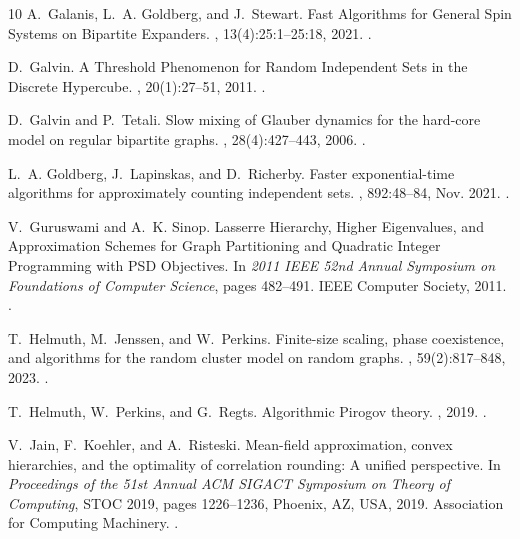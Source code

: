 \documentclass[11pt,letterpaper]{amsart}
\theoremstyle{definition}
\begin{document}
\begin{thebibliography}{10}
A.~Galanis, L.~A. Goldberg, and J.~Stewart.
\newblock Fast {{Algorithms}} for {{General Spin Systems}} on {{Bipartite
  Expanders}}.
, 13(4):25:1--25:18,
  2021.
\newblock {}.

D.~Galvin.
\newblock A {{Threshold Phenomenon}} for {{Random Independent Sets}} in the
  {{Discrete Hypercube}}.
, 20(1):27--51, 2011.
\newblock {}.

D.~Galvin and P.~Tetali.
\newblock Slow mixing of {{Glauber}} dynamics for the hard-core model on
  regular bipartite graphs.
, 28(4):427--443, 2006.
\newblock {}.

L.~A. Goldberg, J.~Lapinskas, and D.~Richerby.
\newblock Faster exponential-time algorithms for approximately counting
  independent sets.
, 892:48--84, Nov. 2021.
\newblock {}.

V.~Guruswami and A.~K. Sinop.
\newblock Lasserre {{Hierarchy}}, {{Higher Eigenvalues}}, and {{Approximation
  Schemes}} for {{Graph Partitioning}} and {{Quadratic Integer Programming}}
  with {{PSD Objectives}}.
\newblock In {\em 2011 {{IEEE}} 52nd {{Annual Symposium}} on {{Foundations}} of
  {{Computer Science}}}, pages 482--491. {IEEE Computer Society}, 2011.
\newblock {}.

T.~Helmuth, M.~Jenssen, and W.~Perkins.
\newblock Finite-size scaling, phase coexistence, and algorithms for the random
  cluster model on random graphs.
, 59(2):817--848, 2023.
\newblock {}.

T.~Helmuth, W.~Perkins, and G.~Regts.
\newblock Algorithmic {{Pirogov}} theory.
, 2019.
\newblock {}.

V.~Jain, F.~Koehler, and A.~Risteski.
\newblock Mean-field approximation, convex hierarchies, and the optimality of
  correlation rounding: A unified perspective.
\newblock In {\em Proceedings of the 51st {{Annual ACM SIGACT Symposium}} on
  {{Theory}} of {{Computing}}}, {{STOC}} 2019, pages 1226--1236, {Phoenix, AZ,
  USA}, 2019. {Association for Computing Machinery}.
\newblock {}.


\end{thebibliography}
\end{document}
